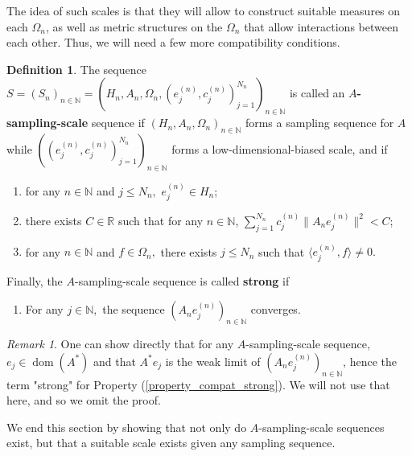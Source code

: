 \documentclass{amsart}
\theoremstyle{definition}
\newtheorem{defn}[thm]{Definition}
\theoremstyle{remark}
\newtheorem{remark}[thm]{Remark}
\def \Dom{\operatorname{dom}}
\newcounter{pointnumber}
\begin{document}
The idea of such scales is that they will allow to construct suitable measures on each $\Omega_n$, as well as metric structures on the $\Omega_n$ that allow interactions between each other. Thus, we will need a few more compatibility conditions.
\begin{defn}\label{definition_sampling_scale_sequence}
	The sequence $S=(S_n)_{n\in\mathbb{N}}=(H_n,A_n,\Omega_n,(e_j^{(n)},c_j^{(n)})_{j=1}^{N_n})_{n\in\mathbb{N}}$ is called an \textbf{$A$-sampling-scale} sequence if $(H_n,A_n,\Omega_n)_{n\in\mathbb{N}}$ forms a sampling sequence for $A$ while $((e_j^{(n)},c_j^{(n)})_{j=1}^{N_n})_{n\in\mathbb{N}}$ forms a low-dimensional-biased scale, and if
	\begin{enumerate}
		\setcounter{enumi}{\value{pointnumber}}
		\item\label{property_compat_H} for any $n\in\mathbb{N}$ and $j\leq N_n,$ $e_j^{(n)}\in H_n$;
		\item\label{property_compat_A} there exists $C\in\mathbb{R}$ such that for any $n\in\mathbb{N}$, $\sum_{j=1}^{N_n}c_j^{(n)}\|A_ne_j^{(n)}\|^2<C$;
		\item\label{property_compat_Omega} for any $n\in\mathbb{N}$ and $f\in\Omega_n,$ there exists $j\leq N_n$ such that $\langle e_j^{(n)},f \rangle \neq 0.$
		\setcounter{pointnumber}{\value{enumi}}
	\end{enumerate}
	
	Finally, the $A$-sampling-scale sequence is called \textbf{strong} if 
	\begin{enumerate}
		\setcounter{enumi}{\value{pointnumber}}
		\item\label{property_compat_strong} For any $j\in\mathbb{N},$ the sequence $(A_ne_j^{(n)})_{n\in\mathbb{N}}$ converges.
	\end{enumerate}	
\end{defn}
\begin{remark}
	One can show directly that for any $A$-sampling-scale sequence, $e_j\in\Dom(A^*)$ and that $A^* e_j$ is the weak limit of $(A_n e_j^{(n)})_{n\in\mathbb{N}}$, hence the term "strong" for Property (\ref{property_compat_strong}). We will not use that here, and so we omit the proof.
\end{remark}
We end this section by showing that not only do $A$-sampling-scale sequences exist, but that a suitable scale exists given any sampling sequence.
\end{document}
